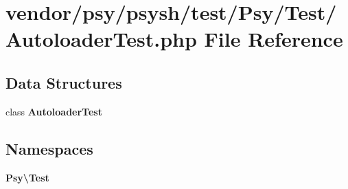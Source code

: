 \section{vendor/psy/psysh/test/\+Psy/\+Test/\+Autoloader\+Test.php File Reference}
\label{psy_2psysh_2test_2_psy_2_test_2_autoloader_test_8php}
\subsection*{Data Structures}
\begin{DoxyCompactItemize}
\item 
class {\bf Autoloader\+Test}
\end{DoxyCompactItemize}
\subsection*{Namespaces}
\begin{DoxyCompactItemize}
\item 
 {\bf Psy\textbackslash{}\+Test}
\end{DoxyCompactItemize}
